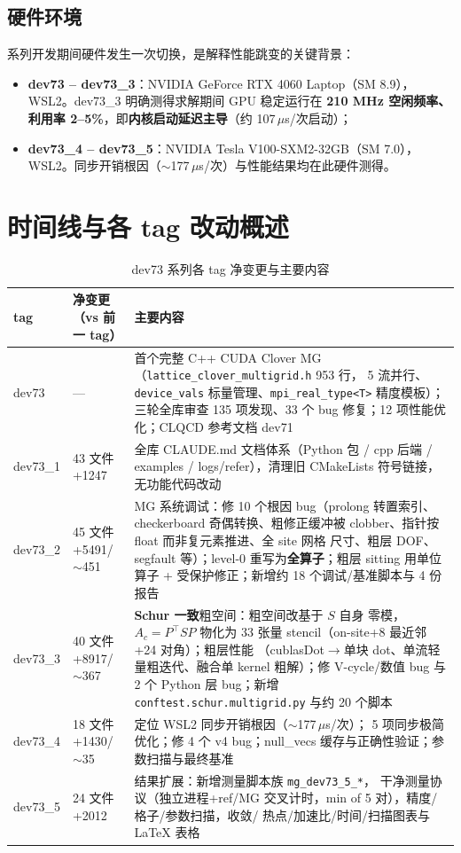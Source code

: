 \documentclass[11pt,a4paper]{article}
\begin{document}
\subsection{硬件环境}
\label{sec:hardware}

系列开发期间硬件发生一次切换，是解释性能跳变的关键背景：
\begin{itemize}
  \item \textbf{dev73 -- dev73\_3}：NVIDIA GeForce RTX 4060 Laptop（SM 8.9），
        WSL2。dev73\_3 明确测得求解期间 GPU 稳定运行在 \textbf{210 MHz 空闲频率、
        利用率 2--5\%}，即\textbf{内核启动延迟主导}（约 107\,$\mu$s/次启动）；
  \item \textbf{dev73\_4 -- dev73\_5}：NVIDIA Tesla V100-SXM2-32GB（SM 7.0），
        WSL2。同步开销根因（$\sim$177\,$\mu$s/次）与性能结果均在此硬件测得。
\end{itemize}

\section{时间线与各 tag 改动概述}
\label{sec:timeline}

\begin{table}[H]
\centering
\small
\begin{tabular}{p{1.7cm}p{3.4cm}p{9.5cm}}
\toprule
tag & 净变更（vs 前一 tag） & 主要内容 \\
\midrule
dev73 & — & 首个完整 C++ CUDA Clover MG（\texttt{lattice\_clover\_multigrid.h} 953 行，
5 流并行、\texttt{device\_vals} 标量管理、\texttt{mpi\_real\_type<T>} 精度模板）；
三轮全库审查 135 项发现、33 个 bug 修复；12 项性能优化；CLQCD 参考文档 dev71 \\
dev73\_1 & 43 文件 +1247 & 全库 CLAUDE.md 文档体系（Python 包 / cpp 后端 / examples /
logs/refer），清理旧 CMakeLists 符号链接，无功能代码改动 \\
dev73\_2 & 45 文件 +5491/$\sim$451 & MG 系统调试：修 10 个根因 bug（prolong 转置索引、
checkerboard 奇偶转换、粗修正缓冲被 clobber、指针按 float 而非复元素推进、全 site 网格
尺寸、粗层 DOF、segfault 等）；level-0 重写为\textbf{全算子}；粗层 sitting 用单位算子 +
受保护修正；新增约 18 个调试/基准脚本与 4 份报告 \\
dev73\_3 & 40 文件 +8917/$\sim$367 & \textbf{Schur 一致}粗空间：粗空间改基于 $S$ 自身
零模，$A_c=P^\top S P$ 物化为 33 张量 stencil（on-site+8 最近邻+24 对角）；粗层性能
（cublasDot$\to$单块 dot、单流轻量粗迭代、融合单 kernel 粗解）；修 V-cycle/数值 bug
与 2 个 Python 层 bug；新增 \texttt{conftest.schur.multigrid.py} 与约 20 个脚本 \\
dev73\_4 & 18 文件 +1430/$\sim$35 & 定位 WSL2 同步开销根因（$\sim$177\,$\mu$s/次）；
5 项同步极简优化；修 4 个 v4 bug；null\_vecs 缓存与正确性验证；参数扫描与最终基准 \\
dev73\_5 & 24 文件 +2012 & 结果扩展：新增测量脚本族 \texttt{mg\_dev73\_5\_*}，
干净测量协议（独立进程+ref/MG 交叉计时，min of 5 对），精度/格子/参数扫描，收敛/
热点/加速比/时间/扫描图表与 LaTeX 表格 \\
\bottomrule
\end{tabular}
\caption{dev73 系列各 tag 净变更与主要内容}
\end{table}
\end{document}
